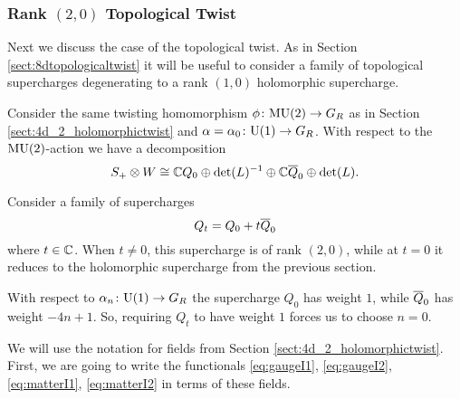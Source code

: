 \documentclass[10pt, oneside]{article}
\begin{document}
\subsubsection{Rank \texorpdfstring{$(2,0)$}{(2,0)} Topological Twist}
\label{sect:4d2Donaldson}

Next we discuss the case of the topological twist. As in Section \ref{sect:8dtopologicaltwist} it will be useful to consider a family of topological supercharges degenerating to a rank $(1, 0)$ holomorphic supercharge.

Consider the same twisting homomorphism $\phi\colon \MU(2)\rightarrow G_R$ as in Section \ref{sect:4d_2_holomorphictwist} and $\alpha=\alpha_0\colon \U(1)\rightarrow G_R$. With respect to the $\MU(2)$-action we have a decomposition
\[S_+\otimes W\cong \CC Q_0 \oplus \det(L)^{-1}\oplus \CC \Bar{Q}_0\oplus \det(L).\]

Consider a family of supercharges
\begin{equation} 
\label{eq:4dHodgefamily}
Q_t = Q_0 + t \Bar{Q}_0
\end{equation}
where $t \in \CC$. When $t \ne 0$, this supercharge is of rank $(2,0)$, while at $t = 0$ it reduces to the holomorphic supercharge from the previous section.

\begin{remark}
With respect to $\alpha_n\colon \U(1)\rightarrow G_R$ the supercharge $Q_0$ has weight $1$, while $\Bar{Q}_0$ has weight $-4n+1$. So, requiring $Q_t$ to have weight $1$ forces us to choose $n=0$.
\end{remark}

We will use the notation for fields from Section \ref{sect:4d_2_holomorphictwist}. First, we are going to write the functionals \eqref{eq:gaugeI1}, \eqref{eq:gaugeI2}, \eqref{eq:matterI1}, \eqref{eq:matterI2} in terms of these fields.
\end{document}
